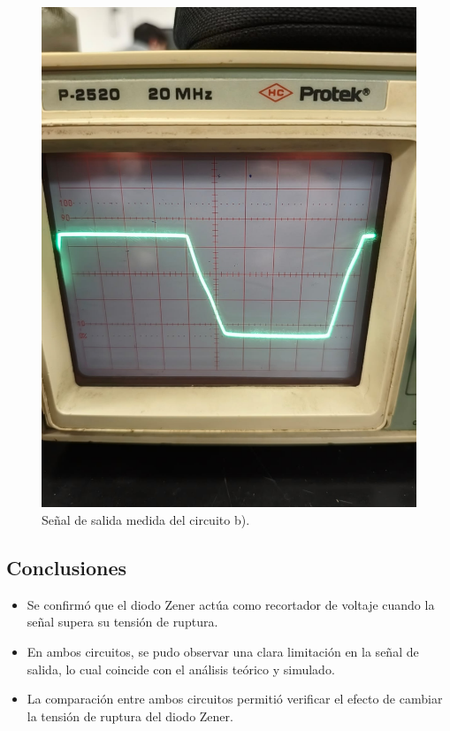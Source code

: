 \documentclass[chaptersright]{informeutn}
\begin{document}
\begin{figure}[H]
\begin{minipage}{0.46\textwidth}
    \includegraphics[width=\textwidth]{pictures/circuito_B_osciloscopio.jpeg}
    \caption{Señal de salida medida del circuito b).}
\end{minipage}
\end{figure}

\subsection*{Conclusiones}

\begin{itemize}
    \item Se confirmó que el diodo Zener actúa como recortador de voltaje cuando la señal supera su tensión de ruptura.
    \item En ambos circuitos, se pudo observar una clara limitación en la señal de salida, lo cual coincide con el análisis teórico y simulado.
    \item La comparación entre ambos circuitos permitió verificar el efecto de cambiar la tensión de ruptura del diodo Zener.
\end{itemize}
  
\end{document}
